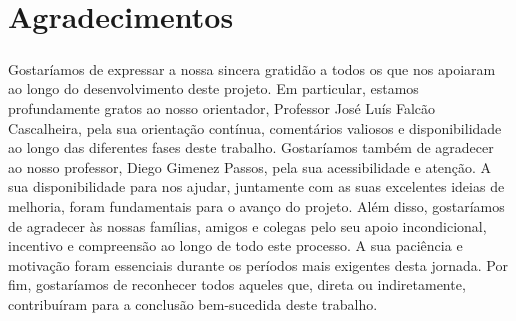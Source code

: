 \chapter*{Agradecimentos}

\paragraph{}Gostaríamos de expressar a nossa sincera gratidão a todos os que nos apoiaram ao longo do desenvolvimento deste projeto. Em particular, estamos profundamente gratos ao nosso orientador, Professor José Luís Falcão Cascalheira, pela sua orientação contínua, comentários valiosos e disponibilidade ao longo das diferentes fases deste trabalho.
Gostaríamos também de agradecer ao nosso professor, Diego Gimenez Passos, pela sua acessibilidade e atenção. A sua disponibilidade para nos ajudar, juntamente com as suas excelentes ideias de melhoria, foram fundamentais para o avanço do projeto.
Além disso, gostaríamos de agradecer às nossas famílias, amigos e colegas pelo seu apoio incondicional, incentivo e compreensão ao longo de todo este processo. A sua paciência e motivação foram essenciais durante os períodos mais exigentes desta jornada.
Por fim, gostaríamos de reconhecer todos aqueles que, direta ou indiretamente, contribuíram para a conclusão bem-sucedida deste trabalho.